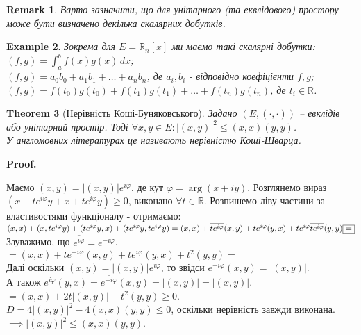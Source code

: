 \documentclass[a4paper, 10pt]{article}
\makeatletter
\theoremstyle{theoremdd}
\newtheorem{theorem}{Theorem}[subsection]
\newtheorem{example}[theorem]{Example}
\newtheorem{remark}[theorem]{Remark}
\renewenvironment{proof}[1][Proof.\\]{\par
\pushQED{\hfill \qed}%
\normalfont \topsep6\p@\@plus6\p@\relax
\trivlist
\item\relax
{\bfseries
#1\@addpunct{.}}\hspace\labelsep\ignorespaces
}{%
\popQED\endtrivlist\@endpefalse
}
\makeatother
\begin{document}
\begin{remark}
Варто зазначити, що для унітарного (та еквлідового) простору може бути визначено декілька скалярних добутків.
\end{remark}

\begin{example}
Зокрема для $E = \mathbb{R}_n[x]$ ми маємо такі скалярні добутки:\\
$(f,g) = \displaystyle\int_a^b f(x)g(x)\,dx$;\\
$(f,g) = a_0 b_0 + a_1 b_1 + \dots + a_n b_n$, де $a_i,b_i$ - відповідно коефіцієнти $f,g$;\\
$(f,g) = f(t_0)g(t_0) + f(t_1)g(t_1) + \dots + f(t_n)g(t_n)$, де $t_i \in \mathbb{R}$.
\end{example}

\begin{theorem}[Нерівність Коші-Буняковського]
Задано $(E, (\cdot , \cdot))$ -- евклідів або унітарний простір. Тоді $\forall x,y \in E: |(x,y)|^2 \leq (x,x)(y,y)$.\\
\textit{У англомовних літературах це називають нерівністю Коші-Шварца.}
\end{theorem}

\begin{proof}
\iffalse
I. \textit{Випадок евклідового простору.}\\
Розглянемо вираз $(x+ty, x+ty) \geq 0$, виконано $\forall t \in \mathbb{R}$. Розпишемо ліву частини за властивостями функціоналу - отримаємо:\\
$(x,x) + t(x,y) + t(y,x) + t^2(y,y) = t^2(y,y) + 2t(x,y) + (x,x) \geq 0$\\
$D = 4(x,y)^2 - 4(x,x)(y,y) \leq 0$, оскільки нерівність завжди виконана $\implies (x,y)^2 \leq (x,x)(y,y)$.
\bigskip \\
II. \textit{Випадок унітарного простору.}\\
\fi
Маємо $(x,y) = |(x,y)|e^{i \varphi}$, де кут $\varphi = \arg (x+iy)$. Розглянемо вираз $(x+te^{i\varphi}y + x + t e^{i\varphi}y) \geq 0$, виконано $\forall t \in \mathbb{R}$. Розпишемо ліву частини за властивостями функціоналу - отримаємо:\\
$(x,x)+(x,te^{i\varphi}y) + (te^{i\varphi}y,x)+(te^{i\varphi}y, te^{i\varphi}y)
= (x,x) + \overline{t e^{i\varphi}}(x,y) + te^{i \varphi} (y,x) + te^{i \varphi} \overline{t e^{i\varphi}} (y,y) \boxed{=} \\ $
Зауважимо, що $\overline{e^{i\varphi}} = e^{-i\varphi}$.\\
$\boxed{=} (x,x) + te^{-i\varphi}(x,y) + te^{i\varphi}(y,x) + t^2(y,y) \boxed{=}$\\
Далі оскільки $(x,y) = |(x,y)|e^{i \varphi}$, то звідси $e^{-i \varphi}(x,y) = |(x,y)|$.\\
А також $e^{i\varphi}(y,x) = \overline{e^{-i\varphi}} \overline{(x,y)} = \overline{|(x,y)|} = |(x,y)|$.\\
$\boxed{=} (x,x) + 2t|(x,y)| + t^2(y,y) \geq 0$.\\
$D = 4|(x,y)|^2 - 4(x,x)(y,y) \leq 0$, оскільки нерівність завжди виконана.\\
$\implies |(x,y)|^2 \leq (x,x)(y,y)$.
\end{proof}
\end{document}
